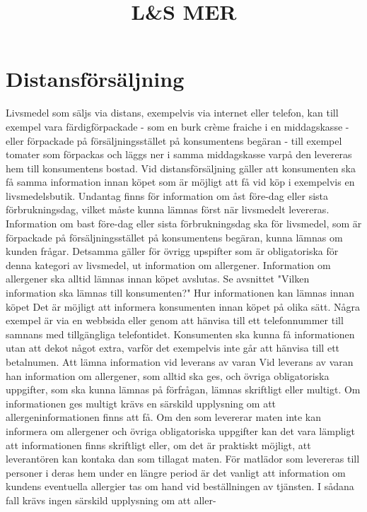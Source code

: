 \section*{Distansförsäljning}
Livsmedel som säljs via distans, exempelvis via internet eller telefon, kan till exempel vara färdigförpackade - som en burk crème fraiche i en middagskasse - eller förpackade på försäljningsstället på konsumentens begäran - till exempel tomater som förpackas och läggs ner i samma middagskasse varpå den levereras hem till konsumentens bostad.
Vid distansförsäljning gäller att konsumenten ska få samma information innan köpet som är möjligt att få vid köp i exempelvis en livsmedelsbutik. Undantag finns för information om åst före-dag eller sista förbrukningsdag, vilket måste kunna lämnas först när livsmedelt levereras. Information om bast före-dag eller sista förbrukningsdag ska för livsmedel, som är förpackade på försäljningsstället på konsumentens begäran, kunna lämnas om kunden frågar. Detsamma gäller för övrigg upspifter som är obligatoriska för denna kategori av livsmedel, ut information om allergener. Information om allergener ska alltid lämnas innan köpet avslutas. Se avsnittet "Vilken information ska lämnas till konsumenten?"
Hur informationen kan lämnas innan köpet
Det är möjligt att informera konsumenten innan köpet på olika sätt. Några exempel är via en webbsida eller genom att hänvisa till ett telefonnummer till samnans med tillgängliga telefontidet. Konsumenten ska kunna få informationen utan att dekot något extra, varför det exempelvis inte går att hänvisa till ett betalnumen.
Att lämna information vid leverans av varan
Vid leverans av varan han information om allergener, som alltid ska ges, och övriga obligatoriska uppgifter, som ska kunna lämnas på förfrågan, lämnas skriftligt eller multigt. Om informationen ges multigt krävs en särskild upplysning om att allergeninformationen finns att få. Om den som levererar maten inte kan informera om allergener och övriga obligatoriska uppgifter kan det vara lämpligt att informationen finns skriftligt eller, om det är praktiskt möjligt, att leverantören kan kontaka dan som tillagat maten. För matlädor som levereras till personer i deras hem under en längre period är det vanligt att information om kundens eventuella allergier tas om hand vid beställningen av tjänsten. I sådana fall krävs ingen särskild upplysning om att aller-

\title{
L\&S MER
}
